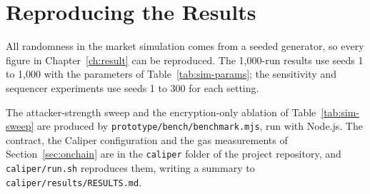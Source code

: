 \section{Reproducing the Results}

All randomness in the market simulation comes from a seeded generator, so every figure in Chapter~\ref{ch:result} can be reproduced. The 1{,}000-run results use seeds 1 to 1{,}000 with the parameters of Table~\ref{tab:sim-params}; the sensitivity and sequencer experiments use seeds 1 to 300 for each setting.

The attacker-strength sweep and the encryption-only ablation of Table~\ref{tab:sim-sweep} are produced by \texttt{prototype/bench/benchmark.mjs}, run with Node.js. The contract, the Caliper configuration and the gas measurements of Section~\ref{sec:onchain} are in the \texttt{caliper} folder of the project repository, and \texttt{caliper/run.sh} reproduces them, writing a summary to \texttt{caliper/results/RESULTS.md}.
